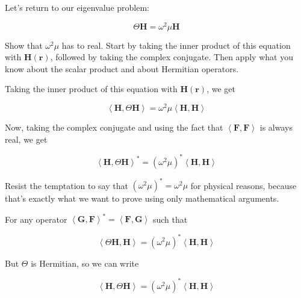 Let's return to our eigenvalue problem:

\begin{equation}
\Theta {\mathbf H} = \omega^2 \mu {\mathbf H}
\end{equation} 

\begin{cue}
Show that $\omega^2 \mu$ has to real. Start by taking the inner product of this equation with ${\mathbf H({\mathbf r})}$, followed by taking the complex conjugate. Then apply what you know about the scalar product and about Hermitian operators.    
\end{cue}

Taking the inner product of this equation with ${\mathbf H({\mathbf r})}$, we get

\begin{equation}
\left\langle{\mathbf H} , \Theta {\mathbf H}\right\rangle  = \omega^2 \mu \left\langle {\mathbf H} , {\mathbf H}\right\rangle \label{eq-real-eigen-1}
\end{equation}

Now, taking the complex conjugate and using the fact that $\left\langle {\mathbf F}, {\mathbf F}\right\rangle$ is always real, we get

\begin{equation}
\left\langle{\mathbf H} , \Theta {\mathbf H}\right\rangle^*  = (\omega^2 \mu)^* \left\langle {\mathbf H} , {\mathbf H}\right\rangle 
\end{equation} 

Resist the temptation to say that $(\omega^2 \mu)^*= \omega^2 \mu $ for physical reasons, because that's exactly what we want to prove using only mathematical arguments.

For any operator $\left\langle {\mathbf G}, {\mathbf F}\right\rangle ^*  = \left\langle {\mathbf F}, {\mathbf G}\right\rangle$ such that

\begin{equation}
\left\langle \Theta {\mathbf H} , {\mathbf H} \right\rangle  = (\omega^2 \mu)^* \left\langle {\mathbf H} , {\mathbf H}\right\rangle 
\end{equation} 

But $\Theta$ is Hermitian, so we can write

\begin{equation}
\left\langle {\mathbf H} , \Theta {\mathbf H} \right\rangle  = (\omega^2 \mu)^* \left\langle {\mathbf H} , {\mathbf H}\right\rangle \label{eq-real-eigen-2}
\end{equation} 

